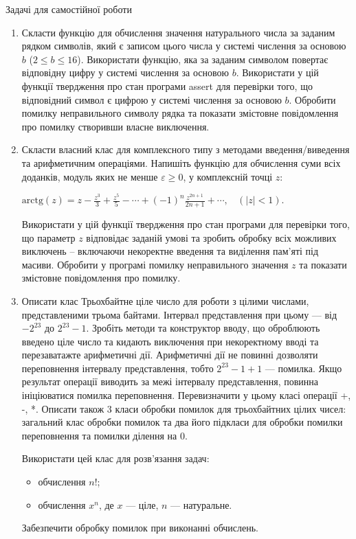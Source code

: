 \documentclass[]{article}
\begin{document}
Задачі для самостійної роботи
\begin{enumerate}
\def\labelenumi{\arabic{enumi})}
\setcounter{enumi}{2}
\item
Скласти функцію для обчислення значення натурального
числа за заданим рядком символів, який є записом цього числа у системі
числення за основою $b$ (\(2 \leq b \leq 16\)). Використати функцію, яка
за заданим символом повертає відповідну цифру у системі числення за
основою $b$. Використати у цій функції твердження про стан програми assert
для перевірки того, що відповідний символ є цифрою у системі числення за
основою $b$. Обробити помилку неправильного символу рядка та
показати змістовне повідомлення про помилку створивши власне виключення.

\item
Скласти власний клас для комплексного типу з методами введення/виведення 
та арифметичним операціями. Напишіть функцію для обчислення суми всіх доданків, модуль
яких не менше $\varepsilon \ge 0$, у комплексній точці $z$:

\(\text{arctg}\left( z \right) = z - \frac{z^{3}}{3} + \frac{z^{5}}{5} - \cdots + {( - 1)}^{n}\frac{z^{2n + 1}}{2n + 1} + \cdots,\ \ \ \ (\left| z \right| < 1)\).

Використати у цій функції твердження про стан програми для перевірки
того, що параметр $z$ відповідає заданій умові та зробить обробку
всіх можливих виключень -- включаючи некоректне введення та виділення
пам'яті під масиви. Обробити у програмі помилку неправильного значення
$z$ та показати змістовне повідомлення про помилку.

\item
Описати клас Трьохбайтне ціле число для роботи з цілими числами,
представленими трьома байтами. Інтервал представлення при цьому --- від
$-2^{23}$ до $2^{23}-1$. 
Зробіть методи та конструктор вводу, що оброблюють введено ціле число
та кидають виключення при некоректному вводі та перезаватажте арифметичні дії. 
Арифметичні дії не повинні дозволяти переповнення інтервалу представлення, 
тобто $2^{23}-1 + 1$ --- помилка. Якщо
результат операції виводить за межі інтервалу представлення, повинна
ініціюватися помилка переповнення. 
Перевизначити у цьому класі операції +, -, *.
Описати також 3 класи обробки помилок для трьохбайтних цілих чисел:
загальний клас обробки помилок та два його підкласи для обробки помилки
переповнення та помилки ділення на 0.

Використати цей клас для розв'язання задач:
\begin{itemize}
\item
обчислення $n!$;
\item
обчислення $x^{n}$, де $x$ --- ціле, $n$ --- натуральне.
\end{itemize}
Забезпечити обробку помилок при виконанні обчислень.



\end{enumerate}
\end{document}
